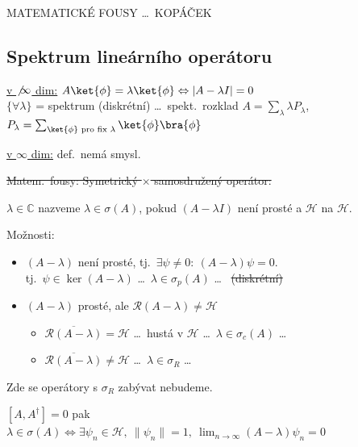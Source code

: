 MATEMATICKÉ FOUSY \dots\ KOPÁČEK

\subsection*{Spektrum lineárního operátoru}
\underline{v $\not\infty$ dim:} \quad $A\ket{\phi} = \lambda\ket{\phi} \Leftrightarrow |A - \lambda I| = 0$ \\
\quad $\{\forall\lambda\}$ = spektrum (diskrétní) \dots\ spekt.\ rozklad \quad $A = \sum_\lambda\lambda P_\lambda$, \quad
$P_\lambda = \sum_{\ket{\phi}\text{ pro fix }\lambda}\ket{\phi}\bra{\phi}$

\underline{v $\infty$ dim:} \quad def.\ nemá smysl.

\sout{Matem.\ fousy: Symetrický $\times$ samosdružený operátor:}

\begin{definice}
$\lambda\in\mathbb{C}$ nazveme  $\lambda\in\sigma(A)$, pokud $(A - \lambda I)$ není prosté a $\mathcal{H}$ na $\mathcal{H}$.
\end{definice}

Možnosti:
\begin{itemize}[nosep]
  \item[(i)] $(A - \lambda)$ není prosté, tj.\ $\exists\psi\neq 0:\ (A - \lambda)\psi = 0$. \\
             tj.\ $\psi\in\ker(A - \lambda)$ \quad \dots\ $\lambda\in\sigma_p(A)$ \dots\  \sout{(diskrétní)}
  \item[(ii)] $(A - \lambda)$ prosté, ale $\mathcal{R}(A - \lambda)\neq\mathcal{H}$
  \begin{itemize}[nosep]
    \item[a)] $\overline{\mathcal{R}(A - \lambda)} = \mathcal{H}$ \dots\ hustá v $\mathcal{H}$ \quad \dots\ $\lambda\in\sigma_c(A)$ \dots\ 
    \item[b)] $\overline{\mathcal{R}(A - \lambda)}\neq\mathcal{H}$ \quad \dots\ $\lambda\in\sigma_R$ \dots\ 
  \end{itemize}
\end{itemize}
Zde se operátory s $\sigma_R$ zabývat nebudeme.

\begin{definice}
$[A, A^\dagger] = 0$ \quad pak \quad
$\lambda\in\sigma(A) \Leftrightarrow \exists\psi_n\in\mathcal{H},\ \|\psi_n\| = 1,\ \lim_{n\to\infty}(A - \lambda)\psi_n = 0$
\end{definice}

